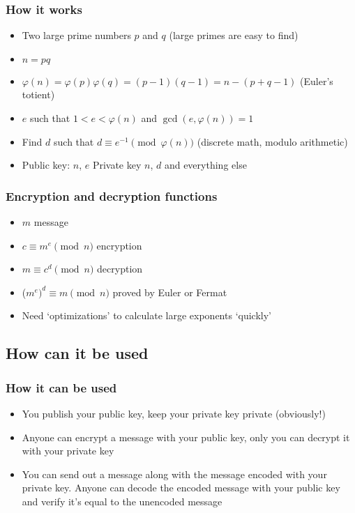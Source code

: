 \documentclass{beamer}
\begin{document}
\begin{frame}
	\frametitle{How it works}
	\begin{itemize}
		\item Two large prime numbers $p$ and $q$ (large primes are
                      easy to find)
		\item $n = pq$
		\item $\varphi(n) = \varphi(p)\varphi(q) = (p-1)(q-1) = n - (p + q -1)$
		      (Euler's totient)
		\item $e$ such that $1 < e < \varphi(n)$ and $\gcd(e, \varphi(n)) = 1$
		\item Find $d$ such that $d \equiv e^{-1} \pmod{\varphi(n)}$
		      (discrete math, modulo arithmetic)
		\item Public key: $n$, $e$ Private key $n$, $d$ and everything else
	\end{itemize}
\end{frame}

\begin{frame}
	\frametitle{Encryption and decryption functions}
	\begin{itemize}
		\item $m$ message
		\item $c \equiv m^e \pmod{n}$ encryption
		\item $m \equiv c^d \pmod{n}$ decryption
		\item ($m^e)^d \equiv m \pmod{n}$ proved by Euler or Fermat
		\item Need `optimizations' to calculate large exponents
		      `quickly'
	\end{itemize}
\end{frame}

\subsection{How can it be used}

\begin{frame}
	\frametitle{How it can be used}

	\begin{itemize}
		\item You publish your public key, keep your private key
		      private (obviously!)

		\item Anyone can encrypt a message with your public key,
		      only you can decrypt it with your private key

		\item You can send out a message along with the message
		      encoded with your private key. Anyone can decode the
		      encoded message with your public key and verify
		      it's equal to the unencoded message
	\end{itemize}
\end{frame}
\end{document}
